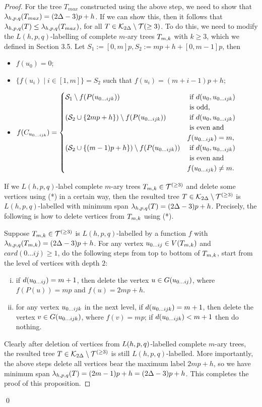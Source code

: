 \begin{proof}
For the tree $T_{max}$ constructed using the above step, we need to show that $\lambda_{h,p,q}(T_{max}) = (2\Delta-3)p+h$. If we can show this, then it follows that $\lambda_{h,p,q}(T) \le \lambda_{h,p,q}(T_{max})$, for all $T \in {\cal K}_{2\Delta} \setminus {\cal T}{(\ge 3)}$. To do this, we need to modify the $L(h,p,q)$-labelling of complete $m$-ary trees $T_{m,k}$ with $k\ge 3$, which we defined in Section 3.5. Let $S_1 := [0,m]p, S_2 := mp+h+[0,m-1]p$, then 
\begin{itemize}
\item $f(u_0) = 0$;
\item $\{f(u_i) \mid i \in [1,m]\} = S_2$ such that $f(u_i) = (m+i-1)p+h$;
\item $f(C_{u_{0 \dots ijk}}) =
 \begin{cases}
 {\cal S}_1 \setminus f(P(u_{0 \dots ijk})) & \text{ if } d(u_0, u_{0\dots ijk}) \\ &\text{ is odd, } \\
 ({\cal S}_2 \cup \{2mp+h\}) \setminus f(P(u_{0 \dots ijk})) & \text{ if } d(u_0, u_{0\dots ijk}) \\ &\text{ is even and } 
 \\ &f(u_{0\dots ijk})=m, \\
  ({\cal S}_2 \cup \{(m-1)p+h\}) \setminus f(P(u_{0 \dots ijk})) & \text{ if } d(u_0, u_{0\dots ijk}) \\ &\text{ is even and } \\ &f(u_{0\dots ijk}) \neq m.
 \end{cases}$
\end{itemize}

If we $L(h,p,q)$-label complete $m$-ary trees $T_{m,k} \in {\cal T}^{(\ge 3)}$ and delete some vertices using (*) in a certain way, then  the resulted tree $T \in {\cal K}_{2\Delta} \setminus {\cal T}^{(\ge 3)}$ is $L(h,p,q)$-labelled with minimum span $\lambda_{h,p,q}(T) = (2\Delta-3)p+h$.  Precisely, the following is how to delete vertices from $T_{m,k}$ using (*). 

Suppose $T_{m,k} \in {\cal T}^{(\ge 3)}$ is $L(h,p,q)$-labelled by a function $f$ with $\lambda_{h,p,q}(T_{m,k}) = (2\Delta-3)p+h$. For any vertex $u_{0\dots ij} \in V(T_{m,k})$ and $card(0\dots ij) \ge 1$, do the following steps from top to bottom of $T_{m,k}$, start from the level of vertices with depth $2$:
\begin{enumerate}[(i)]
\item if $d(u_{0\dots ij}) = m+1$, then delete the vertex $u \in G(u_{0\dots ij})$, where $f(P(u)) = mp$ and $f(u) = 2mp+h$. 
\item for any vertex $u_{0\dots ijk}$ in the next level, if $d(u_{0\dots ijk}) = m+1$, then delete the vertex $v \in G(u_{0\dots ijk})$, where $f(v) = mp$; if $d(u_{0\dots ijk}) < m+1$ then do nothing. 
\end{enumerate}

Clearly after deletion of vertices from $L(h,p,q)$-labelled complete $m$-ary trees, the resulted tree $T \in {\cal K}_{2\Delta} \setminus {\cal T}^{(\ge 3)}$ is still $L(h,p,q)$-labelled. More importantly, the above steps delete all vertices bear the maximum label $2mp+h$, so we have minimum span $\lambda_{h,p,q}(T) = (2m-1)p+h=(2\Delta-3)p+h$. This completes the proof of this proposition. 
\end{proof}
\qed

